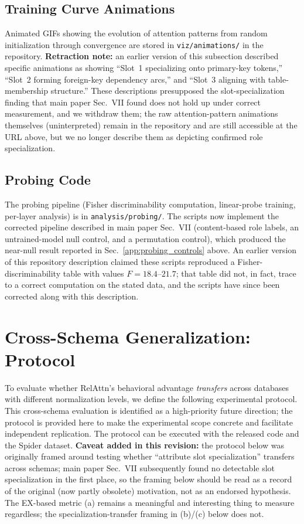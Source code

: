 \documentclass[conference]{IEEEtran}
\begin{document}
\subsection{Training Curve Animations}

Animated GIFs showing the evolution of attention patterns from random initialization through convergence are stored in \texttt{viz/animations/} in the repository. \textbf{Retraction note:} an earlier version of this subsection described specific animations as showing ``Slot~1 specializing onto primary-key tokens,'' ``Slot~2 forming foreign-key dependency arcs,'' and ``Slot~3 aligning with table-membership structure.'' These descriptions presupposed the slot-specialization finding that main paper Sec.~VII found does not hold up under correct measurement, and we withdraw them; the raw attention-pattern animations themselves (uninterpreted) remain in the repository and are still accessible at the URL above, but we no longer describe them as depicting confirmed role specialization.

\subsection{Probing Code}

The probing pipeline (Fisher discriminability computation, linear-probe training, per-layer analysis) is in \texttt{analysis/probing/}. The scripts now implement the corrected pipeline described in main paper Sec.~VII (content-based role labels, an untrained-model null control, and a permutation control), which produced the near-null result reported in Sec.~\ref{app:probing_controls} above. An earlier version of this repository description claimed these scripts reproduced a Fisher-discriminability table with values $F=18.4$--$21.7$; that table did not, in fact, trace to a correct computation on the stated data, and the scripts have since been corrected along with this description.

\section{Cross-Schema Generalization: Protocol}
\label{app:crossschema}

To evaluate whether RelAttn's behavioral advantage \emph{transfers} across databases with different normalization levels, we define the following experimental protocol. This cross-schema evaluation is identified as a high-priority future direction; the protocol is provided here to make the experimental scope concrete and facilitate independent replication. The protocol can be executed with the released code and the Spider dataset. \textbf{Caveat added in this revision:} the protocol below was originally framed around testing whether ``attribute slot specialization'' transfers across schemas; main paper Sec.~VII subsequently found no detectable slot specialization in the first place, so the framing below should be read as a record of the original (now partly obsolete) motivation, not as an endorsed hypothesis. The EX-based metric (a) remains a meaningful and interesting thing to measure regardless; the specialization-transfer framing in (b)/(c) below does not.
\end{document}
